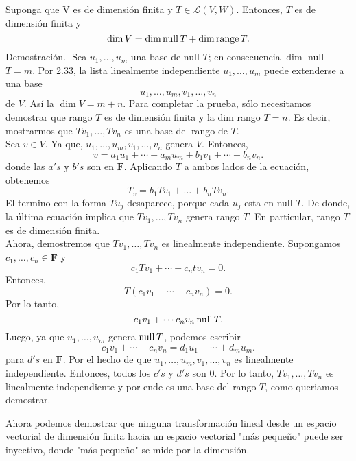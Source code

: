 \setcounter{myteo}{21}
\begin{myteo}\,\\\\
	Suponga que V es de dimensión finita y $T\in \mathcal{L}(V,W)$. Entonces, $T$ es de dimensión finita y 
	$$\dim V = \dim \operatorname{null} T + \dim \operatorname{range} T.$$
	    Demostración.-\; Sea $u_1,\ldots,u_m$ una base de null $T$; en consecuencia $\dim$ null $T=m$. Por 2.33, la lista linealmente independiente $u_1,\ldots,u_m$ puede extenderse a una base
	    $$u_1,\ldots,u_m,v_1,\ldots,v_n$$
	    de $V$. Así la $\dim V=m+n$. Para completar la prueba, sólo necesitamos demostrar que rango $T$ es de dimensión finita y la dim rango $T=n$. Es decir, mostrarmos que  $Tv_1,\ldots,Tv_n$ es una base del rango de $T$.\\

	    Sea $v\in V$. Ya que, $u_1,\ldots,u_m,v_1,\ldots,v_n$ genera $V$. Entonces,
	    $$v=a_1u_1+\cdots+a_mu_m+b_1v_1+\cdots+b_nv_n.$$
	    donde las $a's$ y $b's$ son en $\textbf{F}$. Aplicando $T$ a ambos lados de la ecuación, obtenemos
	    $$T_v=b_1Tv_1+\ldots+b_nTv_n.$$
	    El termino con la forma $Tu_j$ desaparece, porque cada $u_j$ esta en null $T$. De donde, la última ecuación implica que $Tv_1,\ldots,Tv_n$ genera rango $T$. En particular, rango $T$ es de dimensión finita.\\

	    Ahora, demostremos que $Tv_1,\ldots,Tv_n$ es linealmente independiente. Supongamos $c_1,\ldots,c_n\in \textbf{F}$ y 
	    $$c_1Tv_1+\cdots+c_ntv_n=0.$$
	    Entonces,
	    $$T\left(c_1v_1+\cdots +c_nv_n\right)=0.$$
	    Por lo tanto,
	    $$c_1v_1+\cdots c_nv_n \operatorname{null} T.$$
	    Luego, ya que $u_1,\ldots,u_m$ genera $\operatorname{null} T$, podemos escribir
	    $$c_1v_1+\cdots + c_nv_n = d_1u_1+\cdots + d_mu_m.$$
	    para $d's$ en $\textbf{F}$. Por el hecho de que $u_1,\ldots,u_m,v_1,\ldots,v_n$ es linealmente independiente. Entonces,  todos los $c's$ y $d's$ son $0$. Por lo tanto, $Tv_1,\ldots,Tv_n$ es linealmente independiente y por ende es una base del rango $T$, como queriamos demostrar.

\end{myteo}

Ahora podemos demostrar que ninguna transformación lineal desde un espacio vectorial de dimensión finita hacia un espacio vectorial "más pequeño" puede ser inyectivo, donde "más pequeño" se mide por la dimensión.

